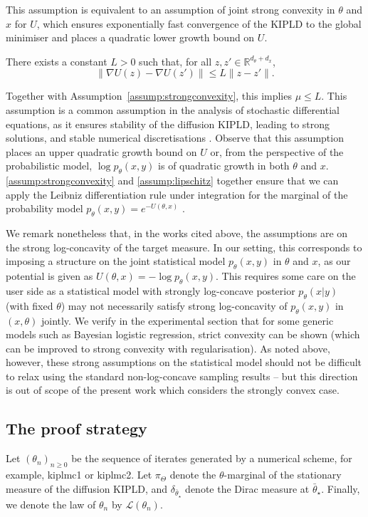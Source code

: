 This assumption is equivalent to an assumption of joint strong convexity in $\theta$ and $x$ for $U$, which ensures exponentially fast convergence of the KIPLD to the global minimiser and places a quadratic lower growth bound on $U$.
\begin{assumption}
\label{assump:lipschitz}
There exists a constant $L>0$ such that, for all $z,z'\in \mathbb{R}^{d_\theta+d_x}$,
\begin{equation*}
\|\nabla U(z) - \nabla U(z')\| \leq L \|z-z'\|.
\end{equation*}
\end{assumption}
Together with Assumption~\ref{assump:strongconvexity}, this implies $\mu\leq L$. This assumption is a common assumption in the analysis of stochastic differential equations, as it ensures stability of the diffusion KIPLD, leading to strong solutions, and stable numerical discretisations \cite{kloeden2012numerical}. Observe that this assumption places an upper quadratic growth bound on $U$ or, from the perspective of the probabilistic model, $\log p_\theta(x,y)$ is of quadratic growth in both $\theta$ and $x$. \ref{assump:strongconvexity} and \ref{assump:lipschitz} together ensure that we can apply the Leibniz differentiation rule under integration for the marginal of the probability model $p_\theta(x, y)= e^{-U(\theta,x)}$ \citep[Theorem~16.8]{billingsley1995probability}.

We remark nonetheless that, in the works cited above, the assumptions are on the strong log-concavity of the target measure. In our setting, this corresponds to imposing a structure on the joint statistical model $p_\theta(x, y)$ in $\theta$ and $x$, as our potential is given as $U(\theta,x) = -\log p_\theta(x,y)$. This requires some care on the user side as a statistical model with strongly log-concave posterior $p_\theta(x | y)$ (with fixed $\theta$) may not necessarily satisfy strong log-concavity of $p_\theta(x, y)$ in $(x, \theta)$ jointly. We verify in the experimental section that for some generic models such as Bayesian logistic regression, strict convexity can be shown (which can be improved to strong convexity with regularisation). As noted above, however, these strong assumptions on the statistical model should not be difficult to relax using the standard non-log-concave sampling results -- but this direction is out of scope of the present work which considers the strongly convex case.

\subsection{The proof strategy}\label{sec:proofstrat}
Let $(\theta_n)_{n\geq 0}$ be the sequence of iterates generated by a numerical scheme, for example, \gls*{kiplmc1} or \gls*{kiplmc2}. Let $\pi_\Theta$ denote the $\theta$-marginal of the stationary measure of the diffusion KIPLD, and $\delta_{\bar{\theta}_\star}$ denote the Dirac measure at $\bar{\theta}_\star$. Finally, we denote the law of $\theta_n$ by $\mathcal{L}(\theta_n)$.

